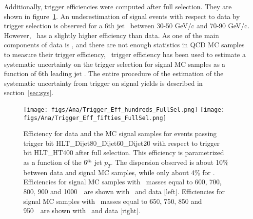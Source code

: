 Additionally, trigger efficiencies were computed after full selection. They are shown in figure~\ref{fig:TrigEffPostMH}. An underestimation of signal events with respect to data by trigger selection is observed for a 6th jet \pt~between 30-50 GeV/c and 70-90 GeV/c. However, \ttbar~has a slightly higher efficiency than data. As one of the main components of data is \ttbar, and there are not enough statistics in QCD MC samples to measure their trigger efficiency, \ttbar~trigger efficiency has been used to estimate a systematic uncertainty on the trigger selection for signal MC samples as a function of 6th leading jet \pt. The entire procedure of the estimation of the systematic uncertainty from trigger on signal yields is described in section~\ref{sec:sys}.
%

\begin{figure}[!Hhtbp]
  \begin{center}
    \texttt{[image: figs/Ana/Trigger\_Eff\_hundreds\_FullSel.png]}
    \texttt{[image: figs/Ana/Trigger\_Eff\_fifties\_FullSel.png]}
    \caption{Efficiency for data and the MC signal samples for events passing trigger bit HLT\_Dijet80\_Dijet60\_Dijet20 with respect to trigger bit HLT\_HT400 after full selection. This efficiency is parametrized as a function of the 6$^{th}$ jet $p_{T}$. The dispersion observed is about 10\% between data and signal MC samples, while only about 4\%  for \ttbar. Efficiencies for signal MC samples with \Tp~masses equal to 600, 700, 800, 900 and 1000~\GeVcc~are shown with \ttbar~and data [left]. Efficiencies for signal MC samples with \Tp~masses equal to 650, 750, 850 and 950~\GeVcc~are shown with \ttbar~and data [right].}
    \label{fig:TrigEffPostMH}
  \end{center}
\end{figure}

